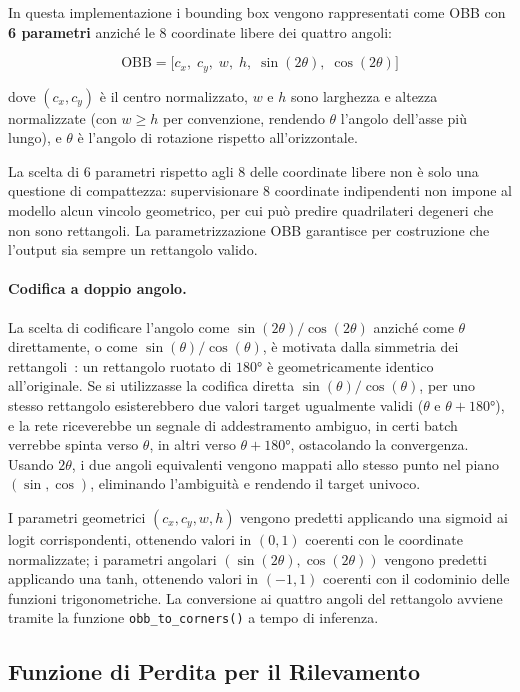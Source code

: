 In questa implementazione i bounding box vengono rappresentati come OBB con \textbf{6 parametri} anziché le 8 coordinate libere dei quattro angoli:

\[
    \text{OBB} = \bigl[c_x,\; c_y,\; w,\; h,\; \sin(2\theta),\; \cos(2\theta)\bigr]
\]

dove $(c_x, c_y)$ è il centro normalizzato, $w$ e $h$ sono larghezza e altezza normalizzate (con $w \geq h$ per convenzione, rendendo $\theta$ l'angolo dell'asse più lungo), e $\theta$ è l'angolo di rotazione rispetto all'orizzontale.

La scelta di 6 parametri rispetto agli 8 delle coordinate libere non è solo una questione di compattezza: supervisionare 8 coordinate indipendenti non impone al modello alcun vincolo geometrico, per cui può predire quadrilateri degeneri che non sono rettangoli. La parametrizzazione OBB garantisce per costruzione che l'output sia sempre un rettangolo valido.

\paragraph{Codifica a doppio angolo.} La scelta di codificare l'angolo come $\sin(2\theta)/\cos(2\theta)$ anziché come $\theta$ direttamente, o come $\sin(\theta)/\cos(\theta)$, è motivata dalla simmetria dei rettangoli~\cite{DBLP:journals/corr/abs-2003-05597}: un rettangolo ruotato di $180°$ è geometricamente identico all'originale. Se si utilizzasse la codifica diretta $\sin(\theta)/\cos(\theta)$, per uno stesso rettangolo esisterebbero due valori target ugualmente validi ($\theta$ e $\theta + 180°$), e la rete riceverebbe un segnale di addestramento ambiguo, in certi batch verrebbe spinta verso $\theta$, in altri verso $\theta + 180°$, ostacolando la convergenza. Usando $2\theta$, i due angoli equivalenti vengono mappati allo stesso punto nel piano $(\sin, \cos)$, eliminando l'ambiguità e rendendo il target univoco.

I parametri geometrici $(c_x, c_y, w, h)$ vengono predetti applicando una sigmoid ai logit corrispondenti, ottenendo valori in $(0,1)$ coerenti con le coordinate normalizzate; i parametri angolari $(\sin(2\theta), \cos(2\theta))$ vengono predetti applicando una tanh, ottenendo valori in $(-1,1)$ coerenti con il codominio delle funzioni trigonometriche. La conversione ai quattro angoli del rettangolo avviene tramite la funzione \texttt{obb\_to\_corners()} a tempo di inferenza.

\subsection{Funzione di Perdita per il Rilevamento}

